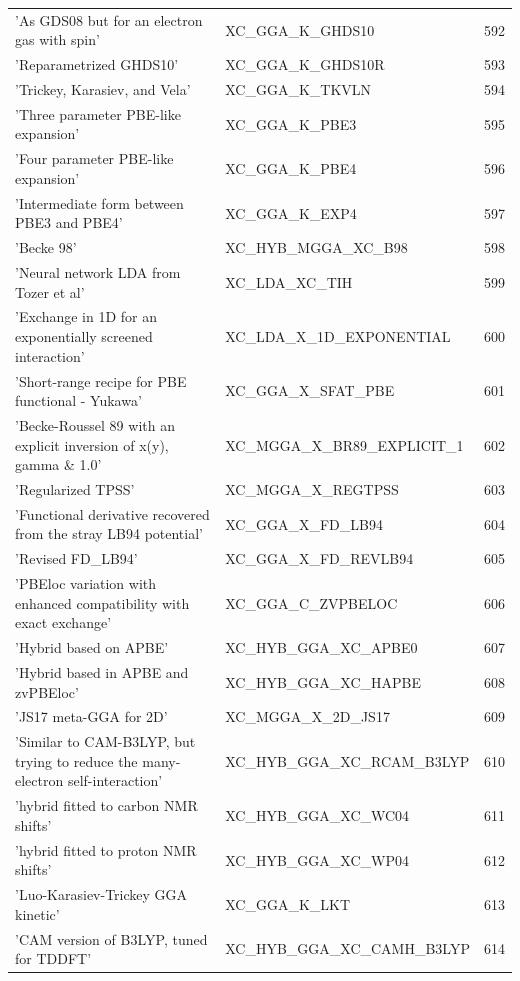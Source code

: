 \documentclass[final,12pt]{article}
\begin{document}
{{{{{{\begin{table}[!h]
\begin{center}
\begin{tabular}{llr}
  'As GDS08 but for an electron gas with spin' & XC\_GGA\_K\_GHDS10  &592\\
  'Reparametrized GHDS10' & XC\_GGA\_K\_GHDS10R  &593\\
  'Trickey, Karasiev, and Vela' & XC\_GGA\_K\_TKVLN  &594\\
  'Three parameter PBE-like expansion' & XC\_GGA\_K\_PBE3  &595\\
  'Four parameter PBE-like expansion' & XC\_GGA\_K\_PBE4  &596\\
  'Intermediate form between PBE3 and PBE4' & XC\_GGA\_K\_EXP4  &597\\
  'Becke 98' & XC\_HYB\_MGGA\_XC\_B98  &598\\
  'Neural network LDA from Tozer et al' & XC\_LDA\_XC\_TIH  &599\\
  'Exchange in 1D for an exponentially screened interaction' & XC\_LDA\_X\_1D\_EXPONENTIAL  &600\\
  'Short-range recipe for PBE functional - Yukawa' & XC\_GGA\_X\_SFAT\_PBE  &601\\
  'Becke-Roussel 89 with an explicit inversion of x(y), gamma \& 1.0' & XC\_MGGA\_X\_BR89\_EXPLICIT\_1  &602\\
  'Regularized TPSS' & XC\_MGGA\_X\_REGTPSS  &603\\
  'Functional derivative recovered from the stray LB94 potential' & XC\_GGA\_X\_FD\_LB94  &604\\
  'Revised FD\_LB94' & XC\_GGA\_X\_FD\_REVLB94  &605\\
  'PBEloc variation with enhanced compatibility with exact exchange' & XC\_GGA\_C\_ZVPBELOC  &606\\
  'Hybrid based on APBE' & XC\_HYB\_GGA\_XC\_APBE0  &607\\
  'Hybrid based in APBE and zvPBEloc' & XC\_HYB\_GGA\_XC\_HAPBE  &608\\
  'JS17 meta-GGA for 2D' & XC\_MGGA\_X\_2D\_JS17  &609\\
  'Similar to CAM-B3LYP, but trying to reduce the many-electron self-interaction' & XC\_HYB\_GGA\_XC\_RCAM\_B3LYP  &610\\
  'hybrid fitted to carbon NMR shifts' & XC\_HYB\_GGA\_XC\_WC04  &611\\
  'hybrid fitted to proton NMR shifts' & XC\_HYB\_GGA\_XC\_WP04  &612\\
  'Luo-Karasiev-Trickey GGA kinetic' & XC\_GGA\_K\_LKT  &613\\
  'CAM version of B3LYP, tuned for TDDFT' & XC\_HYB\_GGA\_XC\_CAMH\_B3LYP  &614\\

\end{tabular}
\end{center}
\end{table}}}}}}}
\end{document}
